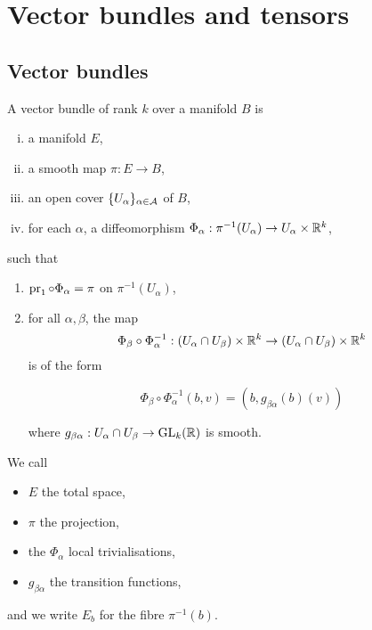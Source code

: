 \section{Vector bundles and tensors}

\subsection{Vector bundles}

\begin{definition}

    A vector bundle of rank \(k\) over a manifold \(B\) is

    \begin{enumerate}[(i)]
        \item a manifold \(E\),
        \item a smooth map \(\pi : E \to B\),
        \item an open cover \(\{U_\alpha\}_{\alpha \in \mathcal{A}}\) of \(B\),
        \item for each \(\alpha\), a diffeomorphism \(\Phi_\alpha : \pi^{-1}(U_\alpha) \to U_\alpha \times \mathbb{R}^k\),
    \end{enumerate}

    such that

    \begin{enumerate}
        \item \(\operatorname{pr}_1 \circ \Phi_\alpha = \pi\) on \(\pi^{-1}(U_\alpha)\),
        \item for all \(\alpha, \beta\), the map
        \[\Phi_\beta \circ \Phi_\alpha^{-1} : (U_\alpha \cap U_\beta) \times \mathbb{R}^k \to (U_\alpha \cap U_\beta)\times \mathbb{R}^k\]
        is of the form

        \[\Phi_\beta \circ \Phi_\alpha^{-1}(b, v) = (b, g_{\beta\alpha}(b)(v))\]

        where \(g_{\beta\alpha} : U_\alpha \cap U_\beta \to \operatorname{GL}_k(\mathbb{R})\) is smooth.
    \end{enumerate}

    We call

    \begin{itemize}
        \item \(E\) the total space,
        \item \(\pi\) the projection,
        \item the \(\Phi_\alpha\) local trivialisations,
        \item \(g_{\beta\alpha}\) the transition functions,
    \end{itemize}

    and we write \(E_b\) for the fibre \(\pi^{-1}(b)\).
\end{definition}

